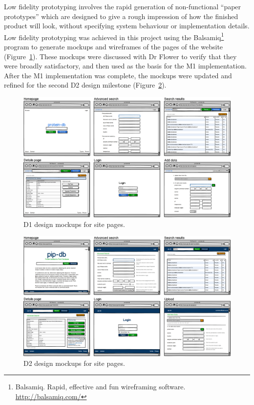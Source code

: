 Low fidelity prototyping involves the rapid generation of
non-functional ``paper prototypes'' which are designed to give a rough
impression of how the finished product will look, without specifying
system behaviour or implementation details. Low fidelity prototyping
was achieved in this project using the
Balsamiq\footnote{Balsamiq. Rapid, effective and fun wireframing
  software. \url{http://balsamiq.com/}} program to generate mockups
and wireframes of the pages of the website
(Figure~\ref{fig:d1-mockups}). These mockups were discussed with Dr
Flower to verify that they were broadly satisfactory, and then used as
the basis for the M1 implementation. After the M1 implementation was
complete, the mockups were updated and refined for the second D2
design milestone (Figure~\ref{fig:d2-mockups}).


\begin{figure}[H]
\centering
    \includegraphics[width=\textwidth]{assets/d1-mockups}
\caption[D1 design mockups for site pages]
        {D1 design mockups for site pages.}
\label{fig:d1-mockups}
\end{figure}


\begin{figure}[H]
\centering
    \includegraphics[width=\textwidth]{assets/d2-mockups}
\caption[D2 design mockups for site pages]
        {D2 design mockups for site pages.}
\label{fig:d2-mockups}
\end{figure}

